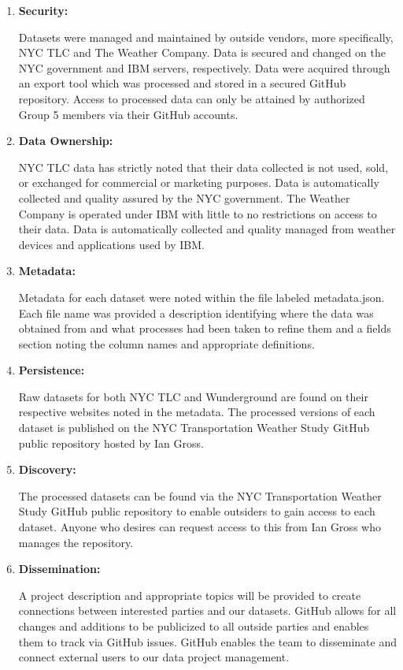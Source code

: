 \documentclass{article}
\begin{document}
\begin{enumerate}
\begin{enumerate}
        \item
        \textbf{Security:}

        Datasets were managed and maintained by outside vendors, more specifically, NYC TLC and The Weather Company. Data is secured and changed on the NYC government and IBM servers, respectively. Data were acquired through an export tool which was processed and stored in a secured GitHub repository. Access to processed data can only be attained by authorized Group 5 members via their GitHub accounts.


        \item
        \textbf{Data Ownership:}

        NYC TLC data has strictly noted that their data collected is not used, sold, or exchanged for commercial or marketing purposes. Data is automatically collected and quality assured by the NYC government. The Weather Company is operated under IBM with little to no restrictions on access to their data. Data is automatically collected and quality managed from weather devices and applications used by IBM.


        \item
        \textbf{Metadata:}

        Metadata for each dataset were noted within the file labeled metadata.json. Each file name was provided a description identifying where the data was obtained from and what processes had been taken to refine them and a fields section noting the column names and appropriate definitions.


        \item
        \textbf{Persistence:}

        Raw datasets for both NYC TLC and Wunderground are found on their respective websites noted in the metadata. The processed versions of each dataset is published on the NYC Transportation Weather Study GitHub public repository hosted by Ian Gross.


        \item
        \textbf{Discovery:}

        The processed datasets can be found via the NYC Transportation Weather Study GitHub public repository to enable outsiders to gain access to each dataset. Anyone who desires can request access to this from Ian Gross who manages the repository.


        \item
        \textbf{Dissemination:}

        A project description and appropriate topics will be provided to create connections between interested parties and our datasets. GitHub allows for all changes and additions to be publicized to all outside parties and enables them to track via GitHub issues. GitHub enables the team to disseminate and connect external users to our data project management.
        
    
    \end{enumerate}



\end{enumerate}
\end{document}
